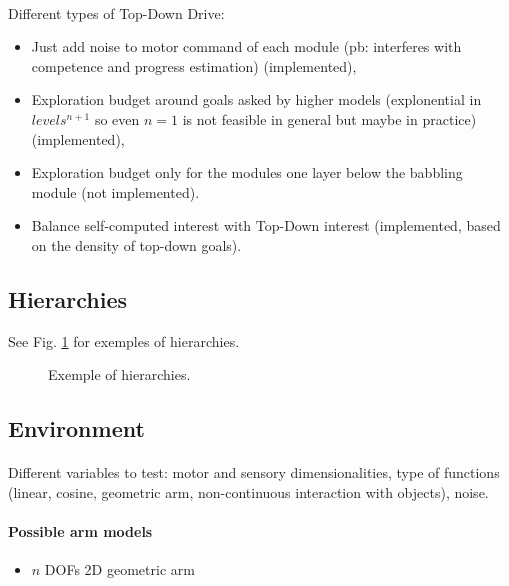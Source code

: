 \documentclass[conference]{include/IEEEtran}
\begin{document}
		\paragraph{}
		Different types of Top-Down Drive:
		\begin{itemize}
			\item Just add noise to motor command of each module (pb: interferes with competence and progress estimation)  (implemented),
			\item Exploration budget around goals asked by higher models (explonential in $levels^{n+1}$ so even $n=1$ is not feasible in general but maybe in practice)  (implemented),
			\item Exploration budget only for the modules one layer below the babbling module (not implemented).
			\item Balance self-computed interest with Top-Down interest (implemented, based on the density of top-down goals).
		\end{itemize}
		
	
	
	\subsection{Hierarchies}
	
		See Fig. \ref{Hierarchies} for exemples of hierarchies.
	
		\begin{figure}[!t]
			\centerline{
			\subfloat[]{}
			\subfloat[]{}}
			\caption{Exemple of hierarchies.}
			\label{Hierarchies}					
		\end{figure}
	
	
	\subsection{Environment}
	
		\paragraph{}
		Different variables to test: motor and sensory dimensionalities, type of functions (linear, cosine, geometric arm, non-continuous interaction with objects), noise.
		
		\paragraph{Possible arm models}
		\begin{itemize}
			\item $n$ DOFs 2D geometric arm
		\end{itemize}
		
\end{document}
